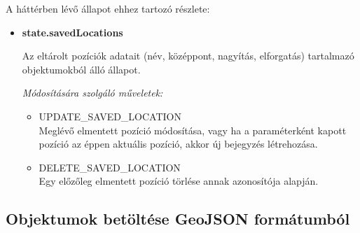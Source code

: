 \noindent A háttérben lévő állapot ehhez tartozó részlete:
\begin{itemize}

  \item \textbf{state.savedLocations}

  Az eltárolt pozíciók adatait (név, középpont, nagyítás, elforgatás)
  tartalmazó objektumokból álló állapot.

  \textit{Módosítására szolgáló műveletek:}

  \begin{itemize}
    \item UPDATE\_SAVED\_LOCATION \\
      Meglévő elmentett pozíció módosítása, vagy ha a paraméterként kapott
      pozíció az éppen aktuális pozíció, akkor új bejegyzés létrehozása.

    \item DELETE\_SAVED\_LOCATION \\
      Egy előzőleg elmentett pozíció törlése annak azonosítója alapján.
  \end{itemize}

\end{itemize}


\subsection{Objektumok betöltése GeoJSON formátumból}

